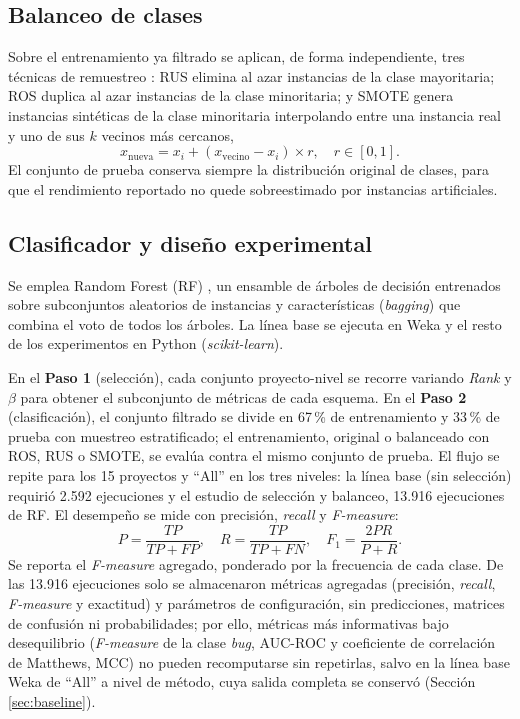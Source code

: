\documentclass[conference,a4paper]{IEEEtran}
\begin{document}
\subsection{Balanceo de clases}
\label{sec:balanceo}

Sobre el entrenamiento ya filtrado se aplican, de forma independiente, tres técnicas de remuestreo \cite{junsomboon2017,hossen2020}: RUS elimina al azar instancias de la clase mayoritaria; ROS duplica al azar instancias de la clase minoritaria; y SMOTE genera instancias sintéticas de la clase minoritaria interpolando entre una instancia real y uno de sus $k$ vecinos más cercanos,
\begin{equation}
x_{\text{nueva}} = x_{i} + (x_{\text{vecino}} - x_{i}) \times r, \quad r \in [0,1].
\label{eq:smote}
\end{equation}
El conjunto de prueba conserva siempre la distribución original de clases, para que el rendimiento reportado no quede sobreestimado por instancias artificiales.

\subsection{Clasificador y diseño experimental}
\label{sec:diseno}

Se emplea Random Forest (RF) \cite{shah2020}, un ensamble de árboles de decisión entrenados sobre subconjuntos aleatorios de instancias y características (\textit{bagging}) que combina el voto de todos los árboles. La línea base se ejecuta en Weka \cite{weka2005} y el resto de los experimentos en Python (\textit{scikit-learn}).

En el \textbf{Paso 1} (selección), cada conjunto proyecto-nivel se recorre variando \textit{Rank} y $\beta$ para obtener el subconjunto de métricas de cada esquema. En el \textbf{Paso 2} (clasificación), el conjunto filtrado se divide en 67\,\% de entrenamiento y 33\,\% de prueba con muestreo estratificado; el entrenamiento, original o balanceado con ROS, RUS o SMOTE, se evalúa contra el mismo conjunto de prueba. El flujo se repite para los 15 proyectos y ``All'' en los tres niveles: la línea base (sin selección) requirió 2.592 ejecuciones y el estudio de selección y balanceo, 13.916 ejecuciones de RF. El desempeño se mide con precisión, \textit{recall} y \textit{F-measure}:
\begin{equation}
P = \frac{TP}{TP+FP}, \quad R = \frac{TP}{TP+FN}, \quad F_{1} = \frac{2PR}{P+R}.
\label{eq:pr}
\end{equation}
Se reporta el \textit{F-measure} agregado, ponderado por la frecuencia de cada clase. De las 13.916 ejecuciones solo se almacenaron métricas agregadas (precisión, \textit{recall}, \textit{F-measure} y exactitud) y parámetros de configuración, sin predicciones, matrices de confusión ni probabilidades; por ello, métricas más informativas bajo desequilibrio (\textit{F-measure} de la clase \textit{bug}, AUC-ROC y coeficiente de correlación de Matthews, MCC) no pueden recomputarse sin repetirlas, salvo en la línea base Weka de ``All'' a nivel de método, cuya salida completa se conservó (Sección \ref{sec:baseline}).
\end{document}
